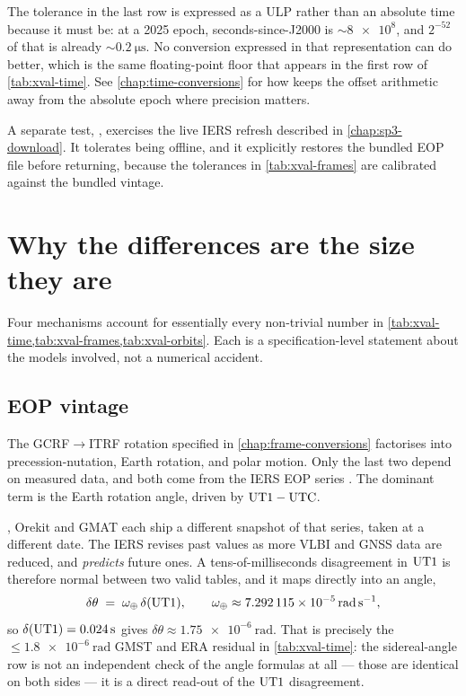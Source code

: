 The tolerance in the last row is expressed as a ULP rather than an absolute
time because it must be: at a 2025 epoch, seconds-since-J2000 is
${\sim}\num{8e8}$, and $2^{-52}$ of that is already
${\sim}\SI{0.2}{\micro\second}$. No conversion expressed in that
representation can do better, which is the same floating-point floor that
appears in the first row of \cref{tab:xval-time}. See
\cref{chap:time-conversions} for how \lupnt{} keeps the offset arithmetic away
from the absolute epoch where precision matters.

A separate test, , exercises the live IERS
refresh described in \cref{chap:sp3-download}. It tolerates being offline, and
it explicitly restores the bundled EOP file before returning, because the
tolerances in \cref{tab:xval-frames} are calibrated against the bundled
vintage.

\section{Why the differences are the size they are}
\label{sec:xval-causes}

Four mechanisms account for essentially every non-trivial number in
\cref{tab:xval-time,tab:xval-frames,tab:xval-orbits}. Each is a
specification-level statement about the models involved, not a numerical
accident.

\subsection{EOP vintage}
\label{sec:xval-eop}

The GCRF$\to$ITRF rotation specified in \cref{chap:frame-conversions}
factorises into precession-nutation, Earth rotation, and polar motion. Only
the last two depend on measured data, and both come from the IERS EOP series
\citep{iers2010}. The dominant term is the Earth rotation angle, driven by
$\mathrm{UT1}-\mathrm{UTC}$.

\lupnt{}, Orekit and GMAT each ship a different snapshot of that series, taken
at a different date. The IERS revises past values as more VLBI and GNSS data
are reduced, and \emph{predicts} future ones. A tens-of-milliseconds
disagreement in $\mathrm{UT1}$ is therefore normal between two valid tables, and it
maps directly into an angle,
\begin{equation}
  \label{eq:xval-ut1-angle}
  \delta\theta \;=\; \omega_\oplus \, \delta(\mathrm{UT1}),
  \qquad \omega_\oplus \approx \SI{7.292115e-5}{\radian\per\second},
\end{equation}
so $\delta(\mathrm{UT1}) = \SI{0.024}{\second}$ gives
$\delta\theta \approx \SI{1.75e-6}{\radian}$. That is precisely the
$\leq \SI{1.8e-6}{\radian}$ GMST and ERA residual in \cref{tab:xval-time}: the
sidereal-angle row is not an independent check of the angle formulas at all
--- those are identical on both sides --- it is a direct read-out of the
$\mathrm{UT1}$ disagreement.

